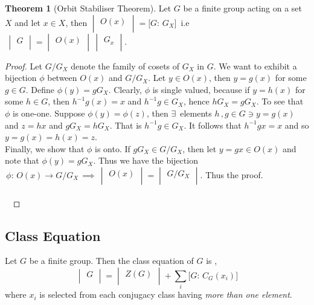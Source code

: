 \documentclass[11pt,a4paper]{article}
\theoremstyle{definition}
\newtheorem{thm}{Theorem}[subsection]
\begin{document}
\begin{thm}[Orbit Stabiliser Theorem]
Let $G$ be a finite group acting on a set $X$ and let $x\in X$, then $\begin{vmatrix}
O(x)\\
\end{vmatrix} = \big[G:\, G_X\big]\,$ i.e $\, \begin{vmatrix}
G\\
\end{vmatrix} = \begin{vmatrix}
O(x)\\
\end{vmatrix}\,\begin{vmatrix}
G_x\\
\end{vmatrix}$.\\
\end{thm}


\begin{proof}
Let $G\big/G_X$ denote the family of cosets of $G_X$ in $G$. We want to exhibit a bijection $\phi$ between $O(x)$ and $G\big/G_X$. Let $y\in O(x)$, then $y = g(x)$ for some $g\in G$. Define $\phi (y) = g G_X$. Clearly, $\phi$ is single valued, because if $y = h(x)$ for some $h\in G$, then $h^{-1}g(x) = x$ and $h^{-1} g\in G_X$, hence $h G_X = g G_X$. To see that $\phi$ is one-one. Suppose $\phi (y) = \phi (z)$, then $\exists\,$ elements $h\, , g\in G\ni y = g(x)$ and $z = hx$ and $g G_X = h G_X$. That is $h^{-1}g\in G_X$. It follows that $h^{-1} g x = x$ and so $y = g(x) = h(x)  = z$.\\
Finally, we show that $\phi$ is onto. If $g G_X\in G\big/G_X$, then let $y = g x \in O(x)$ and note that $\phi (y) = g G_X$. Thus we have the bijection $\, \phi : \, O(x) \longrightarrow G\big/G_X \, \implies\, \begin{vmatrix}
O(x)\\
\end{vmatrix} = \begin{vmatrix}
G\big/ G_X\\
\end{vmatrix}$. Thus the proof.\\\\\
\end{proof}





\subsection{Class Equation}
Let $G$ be a finite group. Then the class equation of $G$ is , $$\begin{vmatrix}
G\\
\end{vmatrix} = \begin{vmatrix}
Z(G)\\
\end{vmatrix} + \sum_i\Big[G:\, C_G(x_i)\Big]$$ where $x_i$ is selected from each conjugacy class having \textit{more than one element}.
\end{document}
